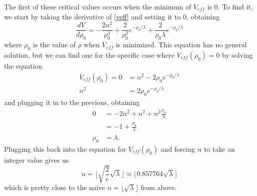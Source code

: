 \documentclass[12pt,twoside]{reedthesis}
\begin{document}
The first of these critical values occurs when the minimum of $V_{eff}$ is 0. To find it, we start by taking the derivative of \eqref{veff} and setting it to 0, obtaining
\begin{equation}
\frac{dV}{d\rho_0}= -\frac{2n^2}{\rho_0^3} + \frac{2}{\rho_0^2}e^{-\rho_0/\lambda} + \frac{2}{\rho_0 \lambda} e^{-\rho_0/\lambda}
\label{vmin}
\end{equation}
where $\rho_0$ is the value of $\rho$ when $V_{eff}$ is minimized. This equation has no general solution, but we can find one for the specific case where $V_{eff}(\rho_0) = 0$ by solving the equation
\begin{align}
V_{eff}(\rho_0)=0 &= n^2 - 2\rho_0 e^{-\rho_0/\lambda} \\
n^2 &= 2 \rho_0 e^{-\rho_0/\lambda}
\end{align}
and plugging it in to the previous, obtaining
\begin{align}
0 &= -2n^2 + n^2 +n^2 \frac{\rho_0}{\lambda} \\
&= -1 + \frac{\rho_0}{\lambda} \\
\rho_0 &= \lambda \mbox{.}
\end{align}
Plugging this back into the equation for $V_{eff}(\rho_0)$ and forcing $n$ to take an integer value gives us
\begin{equation}
n = \lfloor \sqrt{\frac{2}{e}}\sqrt{\lambda} \rfloor \approx \lfloor 0.857764\sqrt{\lambda} \rfloor
\end{equation}
which is pretty close to the naive $n = \lfloor \sqrt{\lambda} \rfloor$ from above. 
\end{document}
